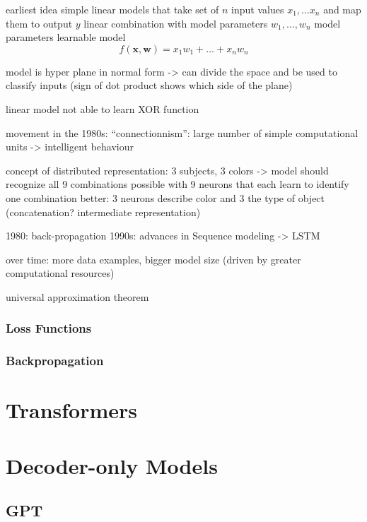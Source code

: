 earliest idea simple linear models that take set of $n$ input values $x_1, \dots x_n$ and map them to output $y$
linear combination with model parameters $w_1, \dots, w_n$
model parameters learnable
model \[
          f(\boldsymbol{x}, \boldsymbol{w}) = x_1 w_1 + \dots + x_n w_n
\]

model is hyper plane in normal form -> can divide the space and be used to classify inputs
(sign of dot product shows which side of the plane) %

linear model not able to learn XOR function


movement in the 1980s: \enquote{connectionnism}:
large number of simple computational units -> intelligent behaviour

concept of distributed representation:
3 subjects, 3 colors -> model should recognize all 9 combinations
possible with 9 neurons that each learn to identify one combination
better: 3 neurons describe color and 3 the type of object (concatenation? intermediate representation)

1980: back-propagation
1990s: advances in Sequence modeling -> LSTM

over time: more data examples, bigger model size (driven by greater computational resources)



universal approximation theorem

\subsubsection{Loss Functions}

\subsubsection{Backpropagation}


\section{Transformers}\label{sec:trans}


\section{Decoder-only Models}\label{sec:decoder}

\subsection{GPT}\label{subsec:gpt}

